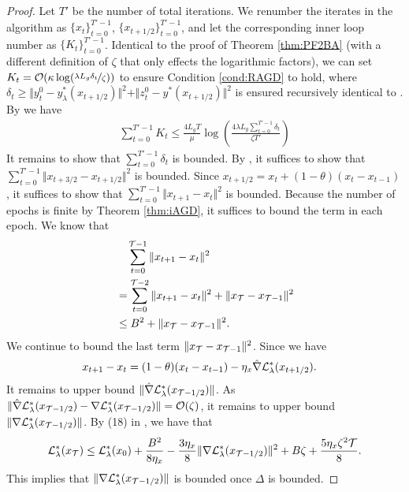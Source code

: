 \thmAccFBA*

\begin{proof}
Let $T'$ be the number of total iterations. We renumber the iterates in the algorithm as $\{x_{t} \}_{t=0}^{T'-1}$,  $\{x_{t+1/2} \}_{t=0}^{T'-1}$, and let the corresponding inner loop number as $\{K_t \}_{t=0}^{T'-1}$.
Identical to the proof of Theorem \ref{thm:PF2BA} (with a different definition of $\zeta$ that only effects the logarithmic factors),
we can set $K_t = {\mathcal{O}}(\kappa \log (\nicefrac{\lambda L_g \delta_t}{\zeta}))$ to
ensure Condition \ref{cond:RAGD} to hold, where 
$\delta_t \ge \Vert y_t^0 - y_{\lambda}^*(x_{t+1/2}) \Vert^2 + \Vert z_t^0 - y^*(x_{t+1/2}) \Vert^2 $ is ensured recursively identical to .
By  we have
\begin{align*}
    \sum_{t=0}^{T'-1} K_t \le \frac{4L_g T}{\mu} \log \left( \frac{4 \lambda L_g \sum_{t=0}^{T'-1}\delta_t}{\zeta T'} \right)
\end{align*}
It remains to show that $\sum_{t=0}^{T'-1} \delta_t$ is bounded.  By , it suffices to show that $\sum_{t=0}^{T'-1} \Vert x_{t+3/2} - x_{t+1/2} \Vert^2  $ is bounded. Since $x_{t+1/2} = x_t + (1-\theta) (x_t - x_{t-1})$, it suffices to show that $\sum_{t=0}^{T'-1} \Vert x_{t+1} - x_t \Vert^2$ is bounded.
Because the number of epochs is finite by Theorem \ref{thm:iAGD}, it suffices to bound the term in each epoch. 
We know that
\begin{align*}
    &\quad \sum_{t=0}^{{\mathcal{T}} -1} \Vert x_{t+1} - x_t \Vert^2  \\
    &= \sum_{t=0}^{{\mathcal{T}} -2} \Vert x_{t+1} - x_t \Vert^2  + \Vert x_{{\mathcal{T}}} - x_{{\mathcal{T}}-1} \Vert^2 \\
    &\le B^2 + \Vert x_{{\mathcal{T}}} - x_{{\mathcal{T}}-1} \Vert^2.
\end{align*}
We continue to bound  the last term $\Vert x_{{\mathcal{T}}} - x_{{\mathcal{T}}-1} \Vert^2$.
Since we have
\begin{align*}
    x_{t+1} - x_{t} &= (1- \theta) (x_t - x_{t-1}) - \eta_x \hat \nabla {\mathcal{L}}_{\lambda}^*(x_{t+1/2}).
\end{align*}
It remains to upper bound $ \Vert \hat \nabla {\mathcal{L}}_{\lambda}^*(x_{{\mathcal{T}}-1/2}) \Vert$. 
As $ \Vert \hat \nabla {\mathcal{L}}_{\lambda}^*(x_{{\mathcal{T}}-1/2}) - \nabla {\mathcal{L}}_{\lambda}^*(x_{{\mathcal{T}}-1/2}) \Vert = {\mathcal{O}}(\zeta)$, it remains to upper bound $\Vert \nabla {\mathcal{L}}_{\lambda}^*(x_{{\mathcal{T}}-1/2}) \Vert$. 
By (18) in \citet{yang2023accelerating}, we have that
\begin{align*}
    {\mathcal{L}}_{\lambda}^*(x_{{\mathcal{T}}}) \le {\mathcal{L}}_{\lambda}^*(x_0) + \frac{B^2}{8 \eta_x} - \frac{3 \eta_x}{8} \Vert \nabla {\mathcal{L}}_{\lambda}^*(x_{{\mathcal{T}}-1/2}) \Vert^2 + B \zeta + \frac{5 \eta_x \zeta^2 {\mathcal{T}}}{8}.
\end{align*}
This implies that $\Vert \nabla {\mathcal{L}}_{\lambda}^*(x_{{\mathcal{T}}-1/2}) \Vert$ is bounded once $\Delta$ is bounded.
\end{proof}

